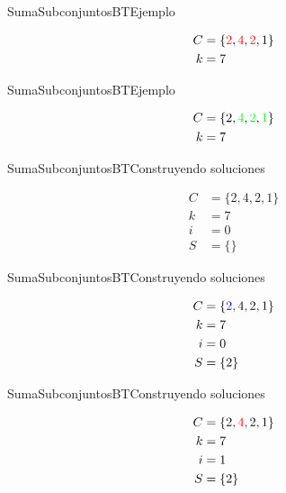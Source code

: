 \documentclass{beamer}
\begin{document}
\begin{frame}{SumaSubconjuntosBT}{Ejemplo}
    
    {\Huge 
    \begin{align*}
        C &= \{\mathcolor{red}{2},\mathcolor{red}{4},\mathcolor{red}{2},1\}\\
        k &= 7
    \end{align*}
    }
\end{frame}

\begin{frame}{SumaSubconjuntosBT}{Ejemplo}
    
    {\Huge 
    \begin{align*}
        C &= \{2,\mathcolor{green}{4},\mathcolor{green}{2},\mathcolor{green}{1}\}\\
        k &= 7
    \end{align*}
    }
\end{frame}

\begin{frame}{SumaSubconjuntosBT}{Construyendo soluciones}

    {\Huge 
    \begin{align*}
        C &= \{2,4,2,1\}\\
        k &= 7\\
        i &= 0\\
        S &= \{\}
    \end{align*}
    }
\end{frame}

\begin{frame}{SumaSubconjuntosBT}{Construyendo soluciones}

    {\Huge 
    \begin{align*}
        C &= \{\mathcolor{blue}{2},4,2,1\}\\
        k &= 7\\
        i &= 0\\
        S &= \{2\}
    \end{align*}
    }
\end{frame}

\begin{frame}{SumaSubconjuntosBT}{Construyendo soluciones}

    {\Huge 
    \begin{align*}
        C &= \{2,\mathcolor{red}{4},2,1\}\\
        k &= 7\\
        i &= 1\\
        S &= \{2\}
    \end{align*}
    }
\end{frame}
\end{document}
